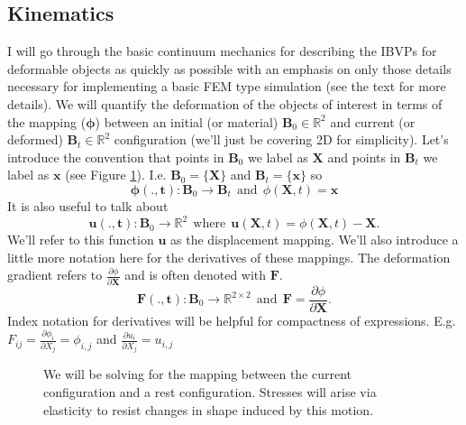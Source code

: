 \documentclass[article]{pcms-l}
\begin{document}
\subsection*{Kinematics}
I will go through the basic continuum mechanics for describing the IBVPs for deformable objects as quickly as possible with an emphasis on only those details necessary for implementing a basic FEM type simulation (see the text \cite{BW08} for more details). We will quantify the deformation of the objects of interest in terms of the mapping ($\mathbf{\phi}$) between an initial (or material) $\mathbf{B}_0\in\mathbb{R}^2$ and current (or deformed) $\mathbf{B}_t\in\mathbb{R}^2$ configuration (we'll just be covering 2D for simplicity). Let's introduce the convention that points in $\mathbf{B}_0$ we label as $\mathbf{X}$ and points in $\mathbf{B}_t$ we label as $\mathbf{x}$ (see Figure \ref{phi}). I.e. $\mathbf{B}_0=\{\mathbf{X}\}$ and $\mathbf{B}_t=\{\mathbf{x}\}$ so
$$
\mathbf{\phi(.,t)}:\mathbf{B}_0\rightarrow\mathbf{B}_t \ \ \textrm{and} \ \ \phi(\mathbf{X},t)=\mathbf{x}
$$
It is also useful to talk about
$$
\mathbf{u(.,t)}:\mathbf{B}_0\rightarrow\mathbb{R}^2\ \ \textrm{where} \ \ \mathbf{u}(\mathbf{X},t)=\phi(\mathbf{X},t)-\mathbf{X}.
$$
We'll refer to this function $\mathbf{u}$ as the displacement mapping. We'll also introduce a little more notation here for the derivatives of these mappings. The deformation gradient refers to $\frac{\partial\phi}{\partial\mathbf{X}}$ and is often denoted with $\mathbf{F}$.
$$
\mathbf{F(.,t)}:\mathbf{B}_0\rightarrow\mathbb{R}^{2\times2}\ \ \textrm{and} \ \ \mathbf{F}=\frac{\partial\phi}{\partial\mathbf{X}}.
$$
Index notation for derivatives will be helpful for compactness of expressions. E.g. $F_{ij}=\frac{\partial\phi_i}{\partial{X}_j}=\phi_{i,j}$ and $\frac{\partial{u}_i}{\partial{X}_j}=u_{i,j}$
\begin{figure}
\caption{We will be solving for the mapping between the current configuration and a rest configuration. Stresses will arise via elasticity to resist changes in shape induced by this motion.}
\label{phi}
\end{figure}
\end{document}
